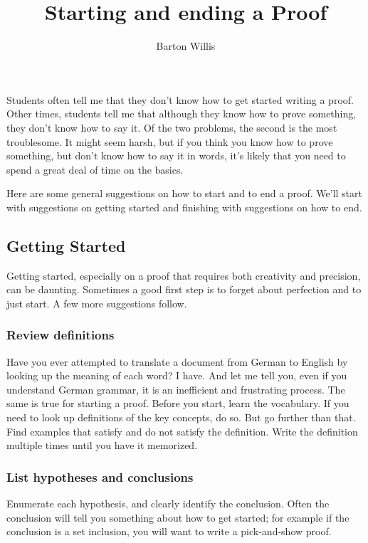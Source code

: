 \documentclass[12pt,fleqn]{article}
\title{Starting and ending a Proof}
\author{Barton Willis}
\newcounter{ex}\setcounter{ex}{0}
\newcounter{id}\setcounter{id}{0}
\newcounter{se}\setcounter{se}{0}
\begin{document}
\maketitle

Students often tell me that they don't know how to get started writing a proof. Other times, students tell me that although they know how to prove something, they don't know how to say it. Of the two problems, the second is the most troublesome. It
might seem harsh, but if you think you know how to prove something, but don't know how to say it in words, it's likely that 
you need to spend a great deal of time on the basics.

Here are some general suggestions on how to start and to end a proof. We'll start with suggestions on 
getting started and finishing with suggestions on how to end.

\subsection{Getting Started}

Getting started, especially on a proof that requires both
creativity and precision, can be daunting.  Sometimes a good first step is to forget about 
perfection and to just start. A few more suggestions follow.

\subsubsection{Review definitions} 

Have you ever attempted to translate a 
document from German to English by looking up the meaning of each 
word? I have. And let me tell you, even if you understand German grammar, 
 it is an inefficient and frustrating process. The same is true
 for starting a proof. Before you start, learn the vocabulary. If you 
 need to look up definitions of the key concepts, do so. But go further than that. 
 Find examples that satisfy and do not satisfy the definition. Write the
 definition multiple times until you have it memorized.

 \subsubsection{List hypotheses and conclusions} 

 Enumerate each hypothesis, and clearly
 identify the conclusion.  Often the conclusion will tell you something about how
 to get started; for example if the conclusion is a set inclusion, you will want
 to write a pick-and-show proof.
\end{document}
